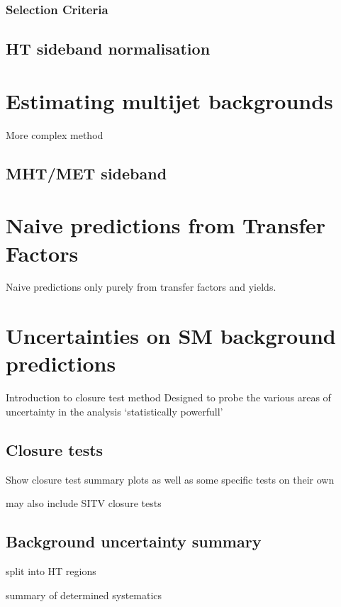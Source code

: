 \subsubsection{Selection Criteria}

\subsection{HT sideband normalisation}

\section{Estimating multijet backgrounds}  %
\label{sec:background_qcd}
More complex method
\subsection{MHT/MET sideband}


\section{Naive predictions from Transfer Factors}  %
\label{sec:background_predictions}
Naive predictions only purely from transfer factors and yields.


\section{Uncertainties on SM background predictions}  %
\label{sec:background_systematics}

Introduction to closure test method
Designed to probe the various areas of uncertainty in the analysis
`statistically powerfull'

\subsection{Closure tests}
Show closure test summary plots as well as some specific tests on their own

may also include SITV closure tests

\subsection{Background uncertainty summary}
split into HT regions

summary of determined systematics
